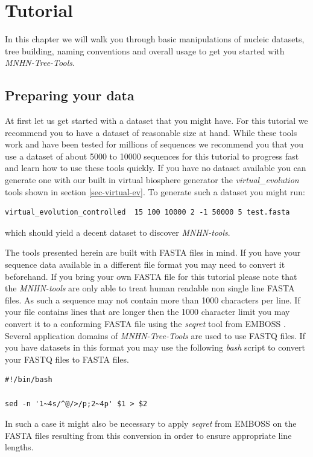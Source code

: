 \chapter{Tutorial}

In this chapter we will walk you through basic manipulations of nucleic
datasets, tree building, naming conventions and overall usage to get
you started with \emph{MNHN-Tree-Tools}.

\section{Preparing your data}

At first let us get started with a dataset that you might have. For this
tutorial we recommend you to have a dataset of reasonable size at
hand. While these tools work and have been tested for millions of
sequences we recommend you that you use a dataset of about 5000 to
10000 sequences for this tutorial to progress fast and learn how to
use these tools quickly. If you have no dataset available you can
generate one with our built in virtual biosphere generator the
\emph{virtual\_evolution} tools shown in section
\ref{sec-virtual-ev}. To generate such a dataset you might run:
\begin{lstlisting}
virtual_evolution_controlled  15 100 10000 2 -1 50000 5 test.fasta
\end{lstlisting}
which should yield a decent dataset to discover \emph{MNHN-tools}.

The tools presented herein are built with FASTA \cite{fasta} files in mind. If
you have your sequence data available in a different file format you
may need to convert it beforehand. If you bring your own FASTA file
for this tutorial please note that the \emph{MNHN-tools} are only able
to treat human readable non single line FASTA files. 
As such a sequence may not contain more than 1000 characters per line.
If your file contains lines that are longer then the 1000 character
limit you may convert it to
a conforming FASTA file using the \emph{seqret} tool from EMBOSS
\cite{emboss}.
Several application domains of \emph{MNHN-Tree-Tools} are used to use FASTQ files.
If you have datasets in this format you may use the following
\emph{bash} script to convert your FASTQ files to FASTA files. 
\begin{lstlisting}
#!/bin/bash

sed -n '1~4s/^@/>/p;2~4p' $1 > $2
\end{lstlisting}
In such a case it might also be necessary to apply \emph{seqret} from
EMBOSS on the FASTA files resulting from this conversion in order to
ensure appropriate line lengths. 

